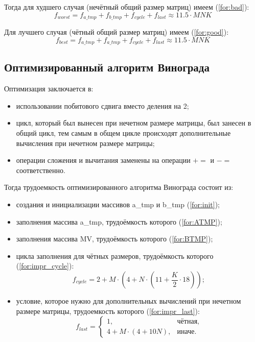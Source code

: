 Тогда для худшего случая (нечётный общий размер матриц) имеем (\ref{for:bad}):
\begin{equation}
	\label{for:bad}
	f_{worst} =  f_{a\_tmp} + f_{b\_tmp} + f_{cycle} + f_{last}\approx 11.5 \cdot MNK
\end{equation}

Для лучшего случая (чётный общий размер матриц) имеем (\ref{for:good}):
\begin{equation}
	\label{for:good}
f_{best} =  f_{a\_tmp} + f_{a\_tmp} + f_{cycle} + f_{last} \approx 11.5 \cdot MNK
\end{equation}


\subsection{Оптимизированный алгоритм Винограда}

Оптимизация заключается в:
\begin{itemize}
    \item использовании побитового сдвига вместо деления на 2;
    \item цикл, который был вынесен при нечетном размере матрицы, был занесен в общий цикл, тем самым в общем цикле происходят дополнительные вычисления при нечетном размере матрицы;
    \item операции сложения и вычитания заменены на операции $+=$ и $-=$ соответственно. \newline
\end{itemize}

Тогда трудоемкость оптимизированного алгоритма Винограда состоит из:

\begin{itemize}
	\item создания и инициализации массивов a\_tmp и b\_tmp (\ref{for:init});
	
	\item заполнения массива a\_tmp, трудоёмкость которого (\ref{for:ATMP});
	
	\item заполнения массива MV, трудоёмкость которого (\ref{for:BTMP});
	
	\item цикла заполнения для чётных размеров, трудоёмкость которого (\ref{for:impr_cycle}):
	\begin{equation}
		\label{for:impr_cycle}
		f_{cycle} =2 + M \cdot (4 + N \cdot (11 + \frac{K}{2} \cdot 18));
	\end{equation}
	
	\item условие, которое нужно для дополнительных вычислений при нечетном размере матрицы, трудоемкость которого (\ref{for:impr_last}):
	\begin{equation}
		\label{for:impr_last}
		f_{last} = 
		\begin{cases}
			1, & \text{чётная,}\\
			4 + M \cdot (4 + 10N), & \text{иначе.}
		\end{cases}
	\end{equation}
\end{itemize}

